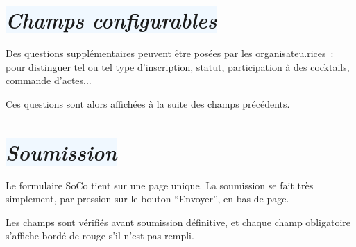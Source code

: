 \documentclass[10pt,a4paper]{article}
\newcommand{\bleupale}[1]{\colorbox{AliceBlue}{#1}}
\begin{document}
\section*{\bleupale{\emph{Champs configurables}}}

Des questions supplémentaires peuvent être posées par les organisateu.rices : pour distinguer tel ou tel type d'inscription, statut, participation à des cocktails, commande d'actes...

Ces questions sont alors affichées à la suite des champs précédents.

\section*{\bleupale{\emph{Soumission}}}

Le formulaire SoCo tient sur une page unique. La soumission se fait très simplement, par pression sur le bouton ``Envoyer'', en bas de page.

Les champs sont vérifiés avant soumission définitive, et chaque champ obligatoire s'affiche bordé de rouge s'il n'est pas rempli.




\vspace{1cm}
\hfill

\end{document}
